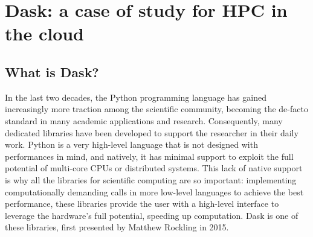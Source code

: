 \chapter{Dask: a case of study for HPC in the cloud}\label{chpt:dask}


\section{What is Dask?}\label{sec:daskintro}

In the last two decades, the Python programming language has gained increasingly
more traction among the scientific community, becoming the de-facto standard in
many academic applications and research. Consequently, many dedicated libraries
have been developed to support the researcher in their daily work. Python is a
very high-level language that is not designed with performances in mind, and
natively, it has minimal support to exploit the full potential of multi-core
CPUs or distributed systems. This lack of native support is why all the
libraries for scientific computing are so important: implementing
computationally demanding calls in more low-level languages to achieve the best
performance, these libraries provide the user with a high-level interface to
leverage the hardware's full potential, speeding up computation. Dask
\cite{dask2015} is one of these libraries, first presented by Matthew Rockling
in 2015.



